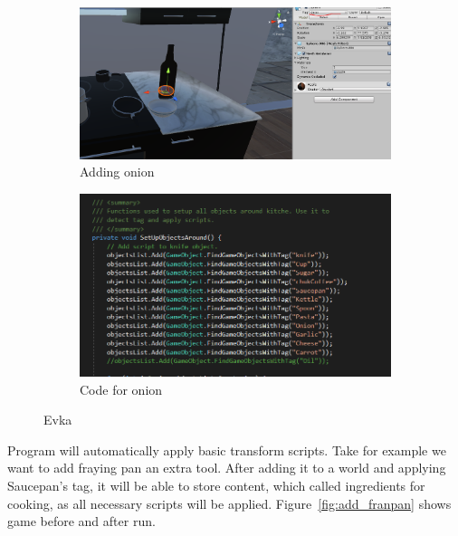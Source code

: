 \documentclass[18pt]{article}
\numberwithin{equation}{section} %
\numberwithin{figure}{section} %
\numberwithin{table}{section} %
\begin{document}
		\begin{figure}[H]
			\centering
			\begin{subfigure}{0.45\textwidth}
				\centering
				\includegraphics[width=1\linewidth]{images/add_onion}
				\caption{Adding onion}
			\end{subfigure}
			\begin{subfigure}{0.45\textwidth}
				\centering
				\includegraphics[width=0.85\linewidth]{images/add_onion_code}
				\caption{Code for onion}
			\end{subfigure}		
			\caption{Evka}
			\label{fig:add_object}
		\end{figure}
		
		Program will automatically apply basic transform scripts. Take for example we want to add fraying pan an extra tool. After adding it to a world and applying Saucepan's tag, it will be able to store content, which called ingredients for cooking, as all necessary scripts will be applied. Figure~\ref{fig:add_franpan} shows game before and after run. \\
		
\end{document}
